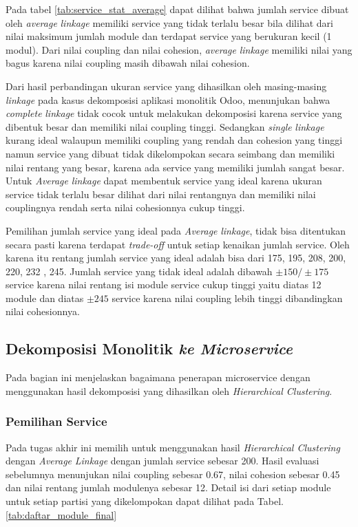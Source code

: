Pada tabel \ref{tab:service_stat_average} dapat dilihat bahwa jumlah service dibuat oleh \textit{average} \textit{linkage} memiliki service yang tidak terlalu besar bila dilihat dari nilai maksimum jumlah module dan terdapat service yang berukuran kecil (1 modul). Dari nilai coupling dan nilai cohesion, \textit{average} \textit{linkage} memiliki nilai yang bagus karena nilai coupling masih dibawah nilai cohesion. 

Dari hasil perbandingan ukuran service yang dihasilkan oleh masing-masing \textit{linkage} pada kasus dekomposisi aplikasi monolitik Odoo, menunjukan bahwa \textit{complete} \textit{linkage} tidak cocok untuk melakukan dekomposisi karena service yang dibentuk besar dan memiliki nilai coupling tinggi. Sedangkan \textit{single} \textit{linkage} kurang ideal walaupun memiliki coupling yang rendah dan cohesion yang tinggi namun service yang dibuat tidak dikelompokan secara seimbang dan memiliki nilai rentang yang besar, karena ada service yang memiliki jumlah sangat besar. Untuk \textit{Average} \textit{linkage} dapat membentuk service yang ideal karena ukuran service tidak terlalu besar dilihat dari nilai rentangnya dan memiliki nilai couplingnya rendah serta nilai cohesionnya cukup tinggi. 

Pemilihan jumlah service yang ideal pada \textit{Average} \textit{linkage}, tidak bisa ditentukan secara pasti karena terdapat \textit{trade-off} untuk setiap kenaikan jumlah service. Oleh karena itu rentang jumlah service yang ideal adalah bisa dari 175, 195, 208, 200, 220, 232 , 245. Jumlah service yang tidak ideal adalah dibawah $\pm 150 / \pm 175$ service karena nilai rentang isi module service cukup tinggi yaitu diatas 12 module dan diatas $\pm 245$ service karena nilai coupling lebih tinggi dibandingkan nilai cohesionnya. \\

\pagebreak

\subsection{Dekomposisi Monolitik \textit{ ke Microservice}}
Pada bagian ini menjelaskan bagaimana penerapan microservice dengan menggunakan hasil dekomposisi yang dihasilkan oleh \textit{Hierarchical Clustering}. 

\subsubsection{Pemilihan Service}
Pada tugas akhir ini memilih untuk menggunakan hasil \textit{Hierarchical Clustering} dengan \textit{Average} \textit{Linkage} dengan jumlah service sebesar 200. Hasil evaluasi sebelumnya menunjukan nilai coupling sebesar 0.67, nilai cohesion sebesar 0.45 dan nilai rentang jumlah modulenya sebesar 12. Detail isi dari setiap module untuk setiap partisi yang dikelompokan dapat dilihat pada Tabel. \ref{tab:daftar_module_final} 

